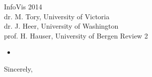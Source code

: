 \documentclass{letter}
\begin{document}
\begin{letter}{InfoVis 2014 \\ dr. M. Tory, University of Victoria \\ dr. J. Heer, University of Washington \\ prof. H. Hauser, University of Bergen}
Review 2
\begin{itemize}
\item 

\end{itemize}


\item 






\closing{Sincerely,}
\end{letter}
\end{document}
